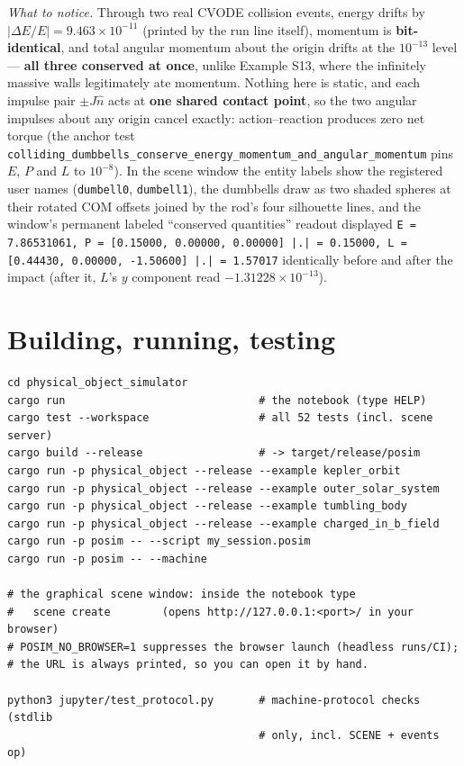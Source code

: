 \documentclass[11pt]{article}
\newcommand{\code}[1]{\texttt{#1}}
\begin{document}
\emph{What to notice.} Through two real CVODE collision events, energy
drifts by $|\Delta E/E| = 9.463\times10^{-11}$ (printed by the run line
itself), momentum is \textbf{bit-identical}, and total angular momentum
about the origin drifts at the $10^{-13}$ level --- \textbf{all three
conserved at once}, unlike Example S13, where the infinitely massive
walls legitimately ate momentum. Nothing here is static, and each
impulse pair $\pm J\hat n$ acts at \textbf{one shared contact point}, so
the two angular impulses about any origin cancel exactly:
action--reaction produces zero net torque (the anchor test
\code{colliding\_dumbbells\_conserve\_energy\_momentum\_and\_angular\_momentum}
pins $E$, $P$ and $L$ to $10^{-8}$). In the scene window the entity
labels show the registered user names (\code{dumbell0},
\code{dumbell1}), the dumbbells draw as two shaded spheres at their
rotated COM offsets joined by the rod's four silhouette lines, and the
window's permanent labeled ``conserved quantities'' readout displayed
\code{E = 7.86531061, P = [0.15000, 0.00000, 0.00000] |.| = 0.15000,
L = [0.44430, 0.00000, -1.50600] |.| = 1.57017} identically before and
after the impact (after it, $L$'s $y$ component read
$-1.31228\times10^{-13}$).

\section{Building, running, testing}

\begin{lstlisting}
cd physical_object_simulator
cargo run                              # the notebook (type HELP)
cargo test --workspace                 # all 52 tests (incl. scene server)
cargo build --release                  # -> target/release/posim
cargo run -p physical_object --release --example kepler_orbit
cargo run -p physical_object --release --example outer_solar_system
cargo run -p physical_object --release --example tumbling_body
cargo run -p physical_object --release --example charged_in_b_field
cargo run -p posim -- --script my_session.posim
cargo run -p posim -- --machine

# the graphical scene window: inside the notebook type
#   scene create        (opens http://127.0.0.1:<port>/ in your browser)
# POSIM_NO_BROWSER=1 suppresses the browser launch (headless runs/CI);
# the URL is always printed, so you can open it by hand.

python3 jupyter/test_protocol.py       # machine-protocol checks (stdlib
                                       # only, incl. SCENE + events op)
\end{lstlisting}
\end{document}
